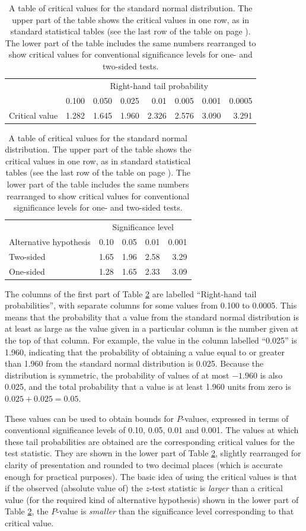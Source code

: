 \begin{table}
\caption{A table of critical values for
the standard normal distribution. The upper part of the table shows
the critical values in one row, as in standard statistical tables
(see the last row of the table on page \pageref{s_disttables_t}). The
lower part of the table includes the same numbers rearranged
to show
critical values for conventional significance levels for one- and
two-sided tests.
}
\label{t_ttable}
\begin{center}
\begin{tabular}{|l|rrrrrrr|}\hline
& \multicolumn{7}{|c|}{Right-hand tail probability} \\ \cline{2-8}
& 0.100 & 0.050 & 0.025 & 0.01 & 0.005 & 0.001 & 0.0005 \\ \hline
Critical value &
1.282 & 1.645 & 1.960 & 2.326 & 2.576 & 3.090 & 3.291 \\
\hline
\end{tabular}

\vspace*{3ex}
\begin{tabular}{|l|rrrr|}\hline
& \multicolumn{4}{|c|}{Significance level} \\ \cline{2-5}
Alternative hypothesis & 0.10 & 0.05 & 0.01 & 0.001 \\ \hline
Two-sided & 1.65 & 1.96 & 2.58 & 3.29\\
One-sided & 1.28 & 1.65 & 2.33 & 3.09 \\ \hline
\end{tabular}
\end{center}
\end{table}

The columns of the first part of Table \ref{t_ttable} are labelled
``Right-hand tail probabilities'', with separate columns for some values
from 0.100 to 0.0005. This means that the probability that a value from
the standard normal distribution is at least as large as
the value given in a particular column is the
number given at the top of that column. For example, the value in the
column labelled ``0.025'' is 1.960, indicating that the probability of
obtaining a value equal to or greater than 1.960 from the standard normal
distribution is 0.025. Because the distribution is symmetric, the
probability of values of at most $-1.960$ is also 0.025, and the total
probability that a value is at least 1.960 units from zero is
$0.025+0.025=0.05$.

These values can be used to obtain bounds for $P$-values, expressed in
terms of conventional  significance levels of 0.10, 0.05, 0.01 and
0.001. The values at which these tail probabilities are obtained are the
corresponding critical values for the test statistic. They are shown in
the lower part of Table \ref{t_ttable}, slightly rearranged for clarity
of presentation and rounded to two decimal places (which is accurate
enough for practical purposes).
The basic idea of using the critical values is that if the observed
(absolute value of) the $z$-test statistic is \emph{larger} than a
critical value (for the required kind of alternative hypothesis) shown
in the lower part of Table \ref{t_ttable}, the $P$-value is
\emph{smaller} than the significance level corresponding to that
critical value.

